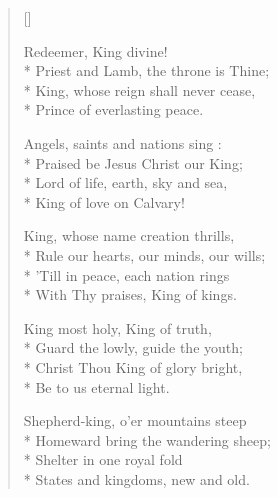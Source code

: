 \newHymn




\begin{verse}[\versewidth]

 Redeemer, King divine!\\*
Priest and Lamb, the throne is Thine;\\*
King, whose reign shall never cease,\\*
Prince of everlasting peace.

\begin{indentedVerse}
\vin Angels, saints and nations sing :\\*
\vin Praised be Jesus Christ our King;\\*
\vin Lord of life, earth, sky and sea,\\*
\vin King of love on Calvary!
\end{indentedVerse}

King, whose name creation thrills,\\*
Rule our hearts, our minds, our wills;\\*
'Till in peace, each nation rings\\*
With Thy praises, King of kings.


King most holy, King of truth,\\*
Guard the lowly, guide the youth;\\*
Christ Thou King of glory bright,\\*
Be to us eternal light.

Shepherd-king, o'er mountains steep\\*
Homeward bring the wandering sheep;\\*
Shelter in one royal fold\\*
States and kingdoms, new and old.

\end{verse}

\Hmeter{}

